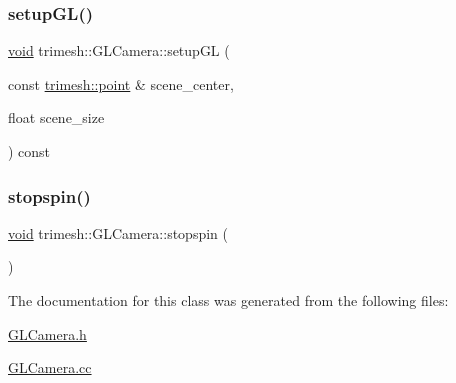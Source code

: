 \mbox{\label{classtrimesh_1_1GLCamera_a060dc2d11b9c7e69e4a03421bf5a0670}} 
\subsubsection{\texorpdfstring{setup\+G\+L()}{setupGL()}}
{\footnotesize\ttfamily \hyperlink{namespacetrimesh_a784ddfd979e1c579bda795a8edfc3f43}{void} trimesh\+::\+G\+L\+Camera\+::setup\+GL (\begin{DoxyParamCaption}\item[{const \hyperlink{namespacetrimesh_a325b99fd6454b22fa4c4bc3223271b2c}{trimesh\+::point} \&}]{scene\+\_\+center,  }\item[{float}]{scene\+\_\+size }\end{DoxyParamCaption}) const}

\mbox{\label{classtrimesh_1_1GLCamera_a588f762c28bffcf7d7c1e176f968ebff}} 
\subsubsection{\texorpdfstring{stopspin()}{stopspin()}}
{\footnotesize\ttfamily \hyperlink{namespacetrimesh_a784ddfd979e1c579bda795a8edfc3f43}{void} trimesh\+::\+G\+L\+Camera\+::stopspin (\begin{DoxyParamCaption}{ }\end{DoxyParamCaption})\hspace{0.3cm}{\ttfamily [inline]}}



The documentation for this class was generated from the following files\+:\begin{DoxyCompactItemize}
\item 
\hyperlink{GLCamera_8h}{G\+L\+Camera.\+h}\item 
\hyperlink{GLCamera_8cc}{G\+L\+Camera.\+cc}\end{DoxyCompactItemize}
